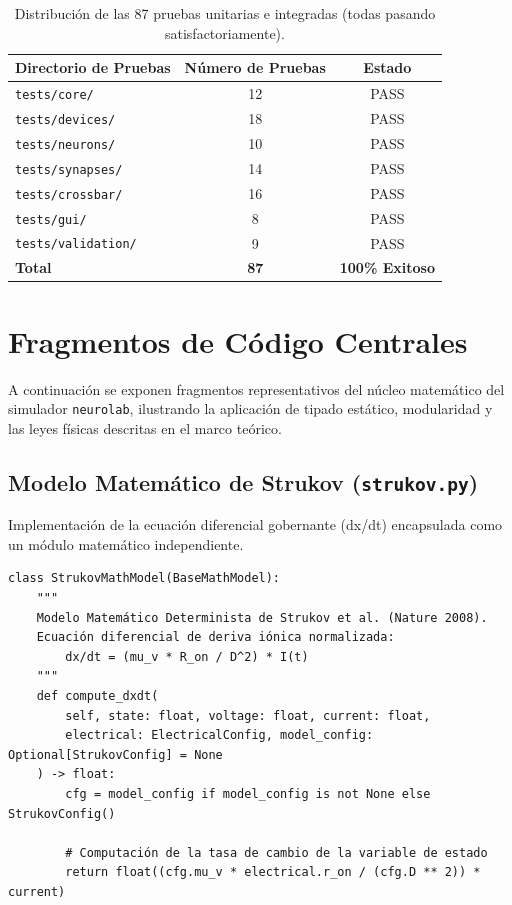 \begin{table}[H]
\caption{Distribución de las 87 pruebas unitarias e integradas (todas pasando satisfactoriamente).}
\label{tab:resumen_tests}
\centering
\begin{tabular}{l c c}
\toprule
Directorio de Pruebas & Número de Pruebas & Estado \\
\midrule
\texttt{tests/core/} & 12 & PASS \\
\texttt{tests/devices/} & 18 & PASS \\
\texttt{tests/neurons/} & 10 & PASS \\
\texttt{tests/synapses/} & 14 & PASS \\
\texttt{tests/crossbar/} & 16 & PASS \\
\texttt{tests/gui/} & 8 & PASS \\
\texttt{tests/validation/} & 9 & PASS \\
\midrule
\textbf{Total} & \textbf{87} & \textbf{100\% Exitoso} \\
\bottomrule
\end{tabular}
\end{table}

\section{Fragmentos de Código Centrales}
\label{sec:fragmentos_codigo}

A continuación se exponen fragmentos representativos del núcleo matemático del simulador \texttt{neurolab}, ilustrando la aplicación de tipado estático, modularidad y las leyes físicas descritas en el marco teórico.

\subsection{Modelo Matemático de Strukov (\texttt{strukov.py})}
Implementación de la ecuación diferencial gobernante (dx/dt) encapsulada como un módulo matemático independiente.

\begin{verbatim}
class StrukovMathModel(BaseMathModel):
    """
    Modelo Matemático Determinista de Strukov et al. (Nature 2008).
    Ecuación diferencial de deriva iónica normalizada:
        dx/dt = (mu_v * R_on / D^2) * I(t)
    """
    def compute_dxdt(
        self, state: float, voltage: float, current: float, 
        electrical: ElectricalConfig, model_config: Optional[StrukovConfig] = None
    ) -> float:
        cfg = model_config if model_config is not None else StrukovConfig()
        
        # Computación de la tasa de cambio de la variable de estado
        return float((cfg.mu_v * electrical.r_on / (cfg.D ** 2)) * current)
\end{verbatim}

